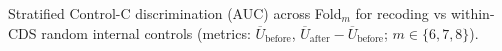 Stratified Control-C discrimination (AUC) across Fold$_m$ for recoding vs within-CDS random internal controls (metrics: $\overline{U}_{\mathrm{before}}$, $\overline{U}_{\mathrm{after}}-\overline{U}_{\mathrm{before}}$; $m\in\{6,7,8\}$).
